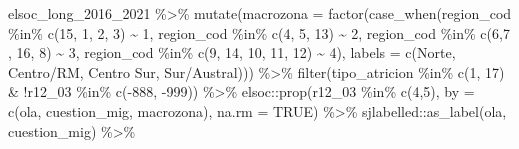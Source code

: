 \documentclass[
  12pt,
]{book}
\newenvironment{Shaded}{\begin{snugshade}}{\end{snugshade}}
\newcommand{\AttributeTok}[1]{\textcolor[rgb]{0.77,0.63,0.00}{#1}}
\newcommand{\ConstantTok}[1]{\textcolor[rgb]{0.00,0.00,0.00}{#1}}
\newcommand{\DecValTok}[1]{\textcolor[rgb]{0.00,0.00,0.81}{#1}}
\newcommand{\FunctionTok}[1]{\textcolor[rgb]{0.00,0.00,0.00}{#1}}
\newcommand{\NormalTok}[1]{#1}
\newcommand{\SpecialCharTok}[1]{\textcolor[rgb]{0.00,0.00,0.00}{#1}}
\newcommand{\StringTok}[1]{\textcolor[rgb]{0.31,0.60,0.02}{#1}}
\begin{document}
\begin{Shaded}
\begin{Highlighting}[]
\NormalTok{elsoc\_long\_2016\_2021 }\SpecialCharTok{\%\textgreater{}\%} 
  \FunctionTok{mutate}\NormalTok{(}\AttributeTok{macrozona =} \FunctionTok{factor}\NormalTok{(}\FunctionTok{case\_when}\NormalTok{(region\_cod }\SpecialCharTok{\%in\%} \FunctionTok{c}\NormalTok{(}\DecValTok{15}\NormalTok{, }\DecValTok{1}\NormalTok{, }\DecValTok{2}\NormalTok{, }\DecValTok{3}\NormalTok{) }\SpecialCharTok{\textasciitilde{}} \DecValTok{1}\NormalTok{,}
\NormalTok{                               region\_cod }\SpecialCharTok{\%in\%} \FunctionTok{c}\NormalTok{(}\DecValTok{4}\NormalTok{, }\DecValTok{5}\NormalTok{, }\DecValTok{13}\NormalTok{) }\SpecialCharTok{\textasciitilde{}} \DecValTok{2}\NormalTok{,}
\NormalTok{                               region\_cod }\SpecialCharTok{\%in\%} \FunctionTok{c}\NormalTok{(}\DecValTok{6}\NormalTok{,}\DecValTok{7}\NormalTok{ , }\DecValTok{16}\NormalTok{, }\DecValTok{8}\NormalTok{) }\SpecialCharTok{\textasciitilde{}} \DecValTok{3}\NormalTok{,}
\NormalTok{                               region\_cod }\SpecialCharTok{\%in\%} \FunctionTok{c}\NormalTok{(}\DecValTok{9}\NormalTok{, }\DecValTok{14}\NormalTok{, }\DecValTok{10}\NormalTok{, }\DecValTok{11}\NormalTok{, }\DecValTok{12}\NormalTok{) }\SpecialCharTok{\textasciitilde{}} \DecValTok{4}\NormalTok{),}
                            \AttributeTok{labels =} \FunctionTok{c}\NormalTok{(}\StringTok{\textquotesingle{}Norte\textquotesingle{}}\NormalTok{, }\StringTok{\textquotesingle{}Centro/RM\textquotesingle{}}\NormalTok{, }\StringTok{\textquotesingle{}Centro Sur\textquotesingle{}}\NormalTok{, }\StringTok{\textquotesingle{}Sur/Austral\textquotesingle{}}\NormalTok{))) }\SpecialCharTok{\%\textgreater{}\%} 
  \FunctionTok{filter}\NormalTok{(tipo\_atricion }\SpecialCharTok{\%in\%} \FunctionTok{c}\NormalTok{(}\DecValTok{1}\NormalTok{, }\DecValTok{17}\NormalTok{) }\SpecialCharTok{\&} \SpecialCharTok{!}\NormalTok{r12\_03 }\SpecialCharTok{\%in\%} \FunctionTok{c}\NormalTok{(}\SpecialCharTok{{-}}\DecValTok{888}\NormalTok{, }\SpecialCharTok{{-}}\DecValTok{999}\NormalTok{)) }\SpecialCharTok{\%\textgreater{}\%} 
\NormalTok{  elsoc}\SpecialCharTok{::}\FunctionTok{prop}\NormalTok{(r12\_03 }\SpecialCharTok{\%in\%} \FunctionTok{c}\NormalTok{(}\DecValTok{4}\NormalTok{,}\DecValTok{5}\NormalTok{), }\AttributeTok{by =} \FunctionTok{c}\NormalTok{(ola, cuestion\_mig, macrozona), }\AttributeTok{na.rm =} \ConstantTok{TRUE}\NormalTok{) }\SpecialCharTok{\%\textgreater{}\%} 
\NormalTok{  sjlabelled}\SpecialCharTok{::}\FunctionTok{as\_label}\NormalTok{(ola, cuestion\_mig) }\SpecialCharTok{\%\textgreater{}\%} 

\end{Highlighting}
\end{Shaded}
\end{document}
